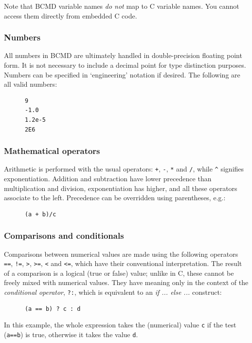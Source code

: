 \documentclass[a4paper,11pt]{article}
\begin{document}
Note that BCMD variable names \textit{do not} map to C variable names. You cannot access them directly from embedded C code.

\subsubsection{Numbers}\label{nums}
All numbers in BCMD are ultimately handled in double-precision floating point form. It is not necessary to include a decimal point for type distinction purposes. Numbers can be specified in `engineering' notation if desired. The following are all valid numbers:
\begin{verbatim}
      9
      -1.0
      1.2e-5
      2E6
\end{verbatim}

\subsubsection{Mathematical operators}
Arithmetic is performed with the usual operators: \texttt{+}, \texttt{-}, \texttt{*} and \texttt{/}, while \texttt{\^} signifies exponentiation. Addition and subtraction have lower precedence than multiplication and division, exponentiation has higher, and all these operators associate to the left. Precedence can be overridden using parentheses, e.g.:
\begin{verbatim}
      (a + b)/c
\end{verbatim}

\subsubsection{Comparisons and conditionals}
Comparisons between numerical values are made using the following operators \texttt{==}, \texttt{!=}, \texttt{>}, \texttt{>=}, \texttt{<} and \texttt{<=}, which have their conventional interpretation. The result of a comparison is a logical (true or false) value; unlike in C, these cannot be freely mixed with numerical values. They have meaning only in the context of the \textit{conditional operator}, \texttt{?:}, which is equivalent to an \textit{if ... else ...} construct:
\begin{verbatim}
      (a == b) ? c : d
\end{verbatim}
In this example, the whole expression takes the (numerical) value \texttt{c} if the test (\texttt{a==b}) is true, otherwise it takes the value \texttt{d}.
\end{document}
